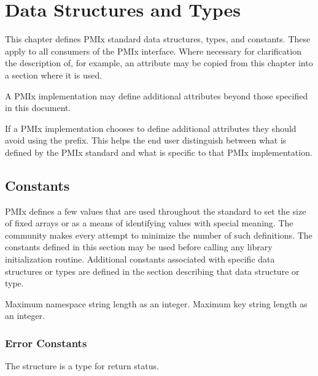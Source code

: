 \chapter{Data Structures and Types}
\label{chap:struct}

This chapter defines PMIx standard data structures, types, and constants.
These apply to all consumers of the PMIx interface.
Where necessary for clarification the description of, for example, an attribute may be copied from this chapter into a section where it is used.

A PMIx implementation may define additional attributes beyond those specified in this document.

\adviceimplstart
If a PMIx implementation chooses to define additional attributes they should avoid using the  prefix.
This helps the end user distinguish between what is defined by the PMIx standard and what is specific to that PMIx implementation.
\adviceimplend


\section{Constants}

\ac{PMIx} defines a few values that are used throughout the standard to set the size of fixed arrays or as a means of identifying values with special meaning. The community makes every attempt to minimize the number of such definitions. The constants defined in this section may be used before calling any library initialization routine.
Additional constants associated with specific data structures or types are defined in the section describing that data structure or type.

\begin{constantdesc}
%
Maximum namespace string length as an integer.
%
Maximum key string length as an integer.
%
\end{constantdesc}

\subsection{Error Constants}
\label{api:struct:errors}

The  structure is a  type for return status.


